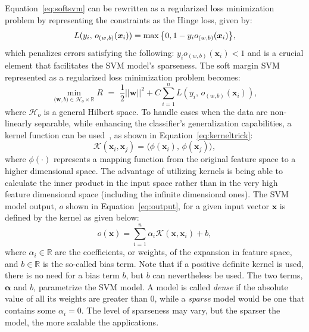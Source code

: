\documentclass[reqno]{vcuthesis}
\newcommand{\set}[1]{{\left\{#1\right\}}}
\newcommand{\reals}{{\mathbb{R}}}
\newcommand{\spa}[1]{\mathcal{#1}}
\numberwithin{equation}{chapter}
\begin{document}
Equation~\ref{eq:softsvm} can be rewritten as a regularized loss minimization problem by representing the constraints as the Hinge loss, given by:
\begin{equation}\label{eqn:hingeloss}
\centering
L(y_i,\, o_{(w,b)}(\bm{x}_i)) = \max \set{0, 1 - y_i o_{(w,b)}(\bm{x}_i)},
\end{equation}
which penalizes errors satisfying the following: $ y_i o_{(w,b)}(\bm{x}_i) < 1$ and is a crucial element that facilitates the SVM model's sparseness. The soft margin SVM represented as a regularized loss minimization problem becomes:
\begin{equation}
\label{eqn:reghingeloss}
\min\limits_{\bm (\bm{w},b) \in \mathcal{H}_o \times \reals} R {\,\,} = {\,\,} \frac{1}{2}||\bm{w}||^2 + C\sum_{i=1}^n L(y_i,\, o_{(w,b)}(\bm{x}_i)),
\end{equation}
where $\mathcal{H}_o$ is a general Hilbert space. To handle cases when the data are non-linearly separable, while enhancing the classifier's generalization capabilities, a kernel function can be used~\cite{Aizerman67theoretical}, as shown in Equation~\ref{eq:kerneltrick}:
\begin{equation}
\spa{K}\left(\bm{x}_i,\bm{x}_j\right) = \langle \phi\left(\bm{x}_i\right),\,\phi\left(\bm{x}_j\right)\rangle,
\label{eq:kerneltrick}
\end{equation}
where $\phi(\cdot)$ represents a mapping function from the original feature space to a higher dimensional space. The advantage of utilizing kernels is being able to calculate the inner product in the input space rather than in the very high feature dimensional space (including the infinite dimensional ones). The SVM model output, $o$ shown in Equation~\ref{eq:output}, for a given input vector $\bm{x}$ is defined by the kernel as given below:
\begin{equation}
o(\bm x) = \sum_{i = 1}^n \alpha_i \mathcal{K}(\bm x, \bm{x}_i) + b,
\label{eq:output}
\end{equation}
where $\alpha_i \in \reals$ are the coefficients, or weights, of the expansion in feature space, and $b \in \reals$ is the so-called bias term. Note that if a positive definite kernel is used, there is no need for a bias term $b$, but $b$ can nevertheless be used. The two terms, $\bm \alpha$ and $b$, parametrize the SVM model. A model is called \textit{dense} if the absolute value of all its weights are greater than $0$, while a \textit{sparse} model would be one that contains some $\alpha_i = 0$. The level of sparseness may vary, but the sparser the model, the more scalable the applications.
\end{document}
